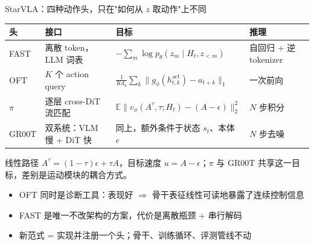 \documentclass[aspectratio=169,10pt]{beamer}
\newcommand{\pos}[1]{\textcolor{positive}{#1}}
\newcommand{\con}[1]{\textcolor{negative}{#1}}
\begin{document}
\begin{frame}{StarVLA：四种动作头，只在"如何从 $z$ 取动作"上不同}
  \vspace{2pt}
  \begin{center}\small
  \begin{tabular}{llll}
    \toprule
    头 & 接口 & 目标 & 推理 \\
    \midrule
    FAST & 离散 token，LLM 词表 & $-\sum_m \log p_\theta(z_m \mid H_t, z_{<m})$ & 自回归 + 逆 tokenizer \\
    OFT & $K$ 个 action query & $\frac{1}{Kd_a}\sum_k \| g_\phi(h^{\mathrm{act}}_{t,k}) - a_{t+k}\|_1$ & 一次前向 \\
    $\pi$ & 逐层 cross-DiT 流匹配 & $\mathbb{E}\|v_\phi(A^\tau,\tau;H_t)-(A-\epsilon)\|_2^2$ & $N$ 步积分 \\
    GR00T & 双系统：VLM 慢 + DiT 快 & 同上，额外条件于状态 $s_t$、本体 $e$ & $N$ 步去噪 \\
    \bottomrule
  \end{tabular}
  \end{center}
  \vspace{4pt}
  线性路径 $A^\tau=(1-\tau)\epsilon+\tau A$，目标速度 $u=A-\epsilon$；$\pi$ 与 GR00T 共享这一目标，差别是运动模块的耦合方式。
  \vspace{4pt}
  \begin{itemize}
    \item \pos{OFT} 同时是诊断工具：表现好 $\Rightarrow$ 骨干表征线性可读地暴露了连续控制信息
    \item \con{FAST} 是唯一不改架构的方案，代价是离散瓶颈 + 串行解码
    \item 新范式 = 实现并注册一个头；骨干、训练循环、评测管线不动
  \end{itemize}
\end{frame}
\end{document}
